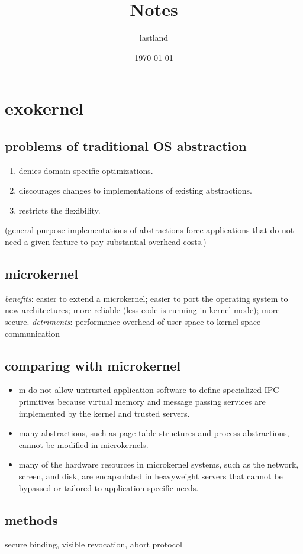 \documentclass[9pt,conference]{IEEEtran}
\author{lastland}
\date{\today}
\title{Notes}
\begin{document}
\section{exokernel}
\label{sec-1}
\subsection{problems of traditional OS abstraction}
\label{sec-1-1}
\begin{enumerate}
\item denies domain-specific optimizations.
\item discourages changes to implementations of existing abstractions.
\item restricts the flexibility.
\end{enumerate}
(general-purpose implementations of abstractions force applications that do not need a given feature to pay substantial overhead costs.)
\subsection{microkernel}
\label{sec-1-2}
\emph{benefits}: easier to extend a microkernel;
easier to port the operating system to new architectures;
more reliable (less code is running in kernel mode); more secure.
\emph{detriments}:
performance overhead of user space to kernel space communication

\subsection{comparing with microkernel}
\label{sec-1-3}
\begin{itemize}
\item m do not allow untrusted application software to define specialized IPC primitives because virtual memory and message passing services are implemented by the kernel and trusted servers.
\item many abstractions, such as page-table structures and process abstractions, cannot be modified in microkernels.
\item many of the hardware resources in microkernel systems, such as the network, screen, and disk, are encapsulated in heavyweight servers that cannot be bypassed or tailored to application-specific needs.
\end{itemize}

\subsection{methods}
\label{sec-1-4}
secure binding, visible revocation, abort protocol
\end{document}
